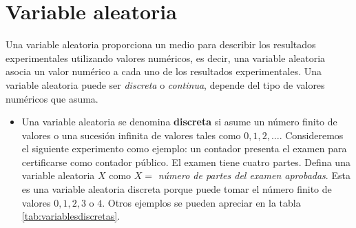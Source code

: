 \documentclass[
  11pt,
]{book}
\providecommand{\tightlist}{%
  \setlength{\itemsep}{0pt}\setlength{\parskip}{0pt}}
\theoremstyle{definition}
\theoremstyle{definition}
\theoremstyle{definition}
\theoremstyle{definition}
\theoremstyle{remark}
\begin{document}
\chapter{Variable aleatoria}\label{probabilidad-variable-aleatoria}

Una variable aleatoria proporciona un medio para describir los resultados experimentales utilizando valores numéricos, es decir, una variable aleatoria asocia un valor numérico a cada uno de los resultados experimentales. Una variable aleatoria puede ser \emph{discreta} o \emph{continua}, depende del tipo de valores numéricos que asuma. \citep[página 187]{anderson}

\begin{itemize}
\tightlist
\item
  Una variable aleatoria se denomina \textbf{discreta} si asume un número finito de valores o una sucesión infinita de valores tales como \(0,1,2,\ldots\). Consideremos el siguiente experimento como ejemplo: un contador presenta el examen para certificarse como contador público. El examen tiene cuatro partes. Defina una variable aleatoria \(X\) como \(X =\) \emph{número de partes del examen aprobadas}. Esta es una variable aleatoria discreta porque puede tomar el número finito de valores \(0,1,2,3\) o \(4\). Otros ejemplos se pueden apreciar en la tabla \ref{tab:variablesdiscretas}.
\end{itemize}

\begin{table}[H]
\centering
\caption{\label{tab:variablesdiscretas}Ejemplos de variables aleatorias discretas}
\centering
{}
\end{table}
\end{document}
